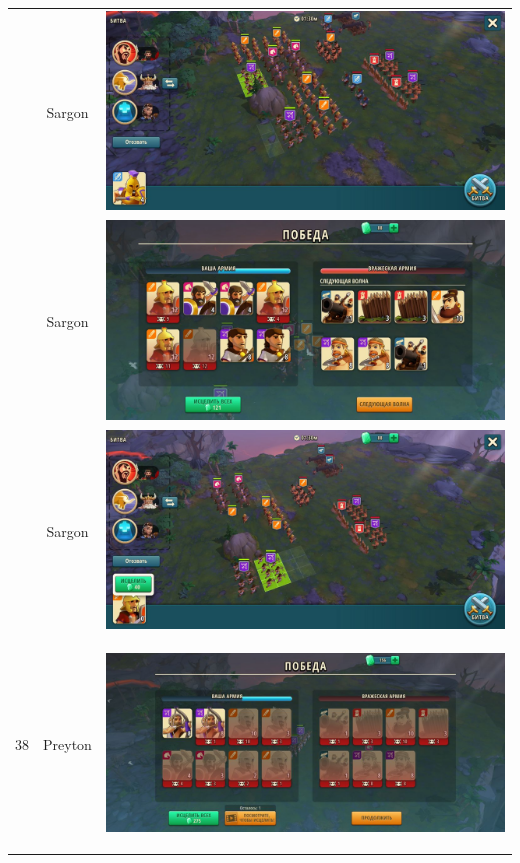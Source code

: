 \begin{longtable}{|c|c|c|}
	& Sargon &
	\includegraphics[width=0.75\linewidth]{./parts/media/TreasureHunt/38/sargon/photo_2022-04-07_13-17-20.jpg} \\
	& Sargon &
	\includegraphics[width=0.75\linewidth]{./parts/media/TreasureHunt/38/sargon/photo_2022-04-07_13-17-28.jpg} \\
	& Sargon &
	\includegraphics[width=0.75\linewidth]{./parts/media/TreasureHunt/38/sargon/photo_2022-04-07_13-17-31.jpg} \\
	\hline
	\multirow{12}{*}{38} & Preyton &
	\hypertarget{fight38}{\includegraphics[width=0.75\linewidth]{./parts/media/TreasureHunt/38/Preyton/38_2.jpg}} \\

\end{longtable}
